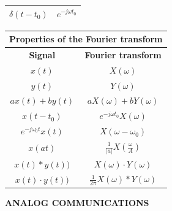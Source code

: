\documentclass[en]{article}
\begin{document}
\begin{center}
\begin{tabular}{|c|c|}
        \hline
        $\delta(t-t_0)$ & $e^{-j \omega t_0}$ \\
        \hline
    \end{tabular}
    \renewcommand{\arraystretch}{1}
    \vspace{0.5cm}
    \renewcommand{\arraystretch}{1.5}
    \begin{tabular}{|c|c|}
        \multicolumn{2}{c}{{\bf Properties of the Fourier transform }} \\
        \hline
        {\bf Signal} & {\bf Fourier transform} \\
        \hline
        $x(t)$ & $X(\omega)$ \\
        \hline
        $y(t)$ & $Y(\omega)$ \\
        \hline
        $a x(t) + b y(t) $ & $a X(\omega) + b Y(\omega)$ \\
        \hline
        $x(t-t_0)$ & $e^{-j \omega t_0} X(\omega)$ \\
        \hline
        $e^{-j\omega_0 t} x(t)$ & $X(\omega - \omega_0)$ \\
        \hline
        $x(at)$ & $\displaystyle\frac{1}{|a|}X \left ( \displaystyle\frac{\omega}{A} \right )$ \\
        \hline
        $x(t) \ast y(t))$ & $X(\omega) \cdot Y(\omega)$ \\
        \hline
        $x(t) \cdot y(t))$ & $\displaystyle\frac{1}{2\pi} X(\omega) \ast Y(\omega)$ \\
        \hline
      
    \end{tabular}
    \renewcommand{\arraystretch}{1}
    \vspace{1.5cm}

    \newpage
 
    {\bf ANALOG COMMUNICATIONS}


\end{center}
\end{document}
